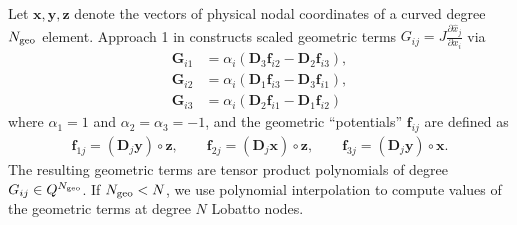 \documentclass{svjour3}                     %
\renewcommand{\hat}{\widehat}
\newcommand{\pd}[2]{\frac{\partial#1}{\partial#2}}
\newcommand{\LRp}[1]{\left( #1 \right)}
\begin{document}
Let $\bm{x},\bm{y},\bm{z}$ denote the vectors of physical nodal coordinates of a curved degree $N_{\rm geo}$ element.  Approach 1 in \cite{kopriva2006metric} constructs scaled geometric terms $G_{ij} = J\pd{\hat{x}_j}{x_i}$ via
\begin{align*}
\bm{G}_{i1} &= \alpha_i\LRp{\bm{D}_3\bm{f}_{i2} - \bm{D}_2\bm{f}_{i3}},\\
\bm{G}_{i2} &=\alpha_i \LRp{\bm{D}_1\bm{f}_{i3} - \bm{D}_3\bm{f}_{i1}},\\
\bm{G}_{i3} &= \alpha_i\LRp{\bm{D}_2\bm{f}_{i1} - \bm{D}_1\bm{f}_{i2}}
\end{align*}
where $\alpha_1 = 1$ and $\alpha_2 = \alpha_3 = -1$, and the geometric ``potentials'' $\bm{f}_{ij}$ are defined as 
\begin{align}
\bm{f}_{1j} = \LRp{ \bm{D}_j \bm{y}} \circ \bm{z}, \qquad 
\bm{f}_{2j} = \LRp{ \bm{D}_j \bm{x}} \circ \bm{z}, \qquad
\bm{f}_{3j} = \LRp{ \bm{D}_j \bm{y}} \circ \bm{x}.  \label{eq:geopot}
\end{align}
The resulting geometric terms are tensor product polynomials of degree $G_{ij} \in Q^{N_{\rm geo}}$.  If $N_{\rm geo} < N$, we use polynomial interpolation to compute values of the geometric terms at degree $N$ Lobatto nodes.  
\end{document}
